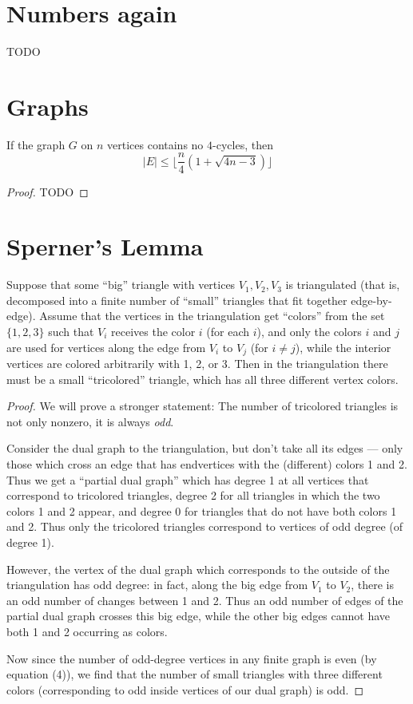 \section{Numbers again}
 TODO

\section{Graphs}
\begin{theorem}
  \label{ch28theorem}
  If the graph $G$ on $n$ vertices contains no $4$-cycles, then
  \[
  |E| \le \lfloor\frac{n}{4}(1 + \sqrt{4n - 3})\rfloor
  \]
\end{theorem}
\begin{proof}
  TODO
\end{proof}

\section{Sperner's Lemma}
\begin{lemma}
  \label{sperner}
  Suppose that some “big” triangle with vertices $V_1, V_2, V_3$ is triangulated (that is, decomposed into a finite number of “small” triangles that fit together edge-by-edge).
Assume that the vertices in the triangulation get “colors” from the set $\{1, 2, 3\}$ such that $V_i$ receives the color $i$ (for each $i$), and only the colors $i$ and $j$ are used for vertices along the edge from $V_i$ to $V_j$ (for $i \neq j$), while the interior vertices are colored arbitrarily with 1, 2, or 3.
Then in the triangulation there must be a small “tricolored” triangle, which has all three different vertex colors.
\end{lemma}
\begin{proof}
  We will prove a stronger statement: The number of tricolored triangles is not only nonzero, it is always \textit{odd}.

Consider the dual graph to the triangulation, but don’t take all its edges — only those which cross an edge that has endvertices with the (different) colors 1 and 2. Thus we get a “partial dual graph” which has degree 1 at all vertices that correspond to tricolored triangles, degree 2 for all triangles in which the two colors 1 and 2 appear, and degree 0 for triangles that do not have both colors 1 and 2. Thus only the tricolored triangles correspond to vertices of odd degree (of degree 1).

However, the vertex of the dual graph which corresponds to the outside of the triangulation has odd degree: in fact, along the big edge from $V_1$ to $V_2$, there is an odd number of changes between 1 and 2. Thus an odd number of edges of the partial dual graph crosses this big edge, while the other big edges cannot have both 1 and 2 occurring as colors.

Now since the number of odd-degree vertices in any finite graph is even (by equation (4)), we find that the number of small triangles with three different colors (corresponding to odd inside vertices of our dual graph) is odd.
\end{proof}

